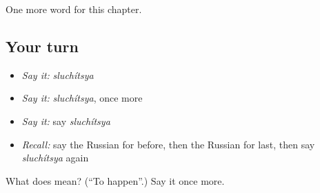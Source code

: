 \begin{grammarlens}[title={What you've built}]
One more word for this chapter.
\end{grammarlens}

\subsection*{Your turn}
\begin{itemize}
\raggedright
  \item \emph{Say it:} \emph{sluchítsya}
  \item \emph{Say it:} \emph{sluchítsya}, once more
  \item \emph{Say it:} say \emph{sluchítsya}
  \item \emph{Recall:} say the Russian for before, then the Russian for last, then say \emph{sluchítsya} again
\end{itemize}

\begin{tcolorbox}[breakable,colback=teal!4,colframe=teal!35!black,title={Before you move on}]
What does  mean? (\textquotedblleft{}To happen\textquotedblright{}.) Say it once more.
\end{tcolorbox}
